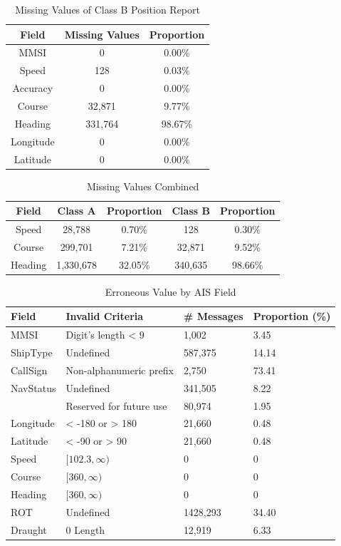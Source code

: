 \begin{table}[t!]
    \centering
    \caption{Missing Values of Class B Position Report}
    \label{tab:table3}
    \begin{tabular}{c|c|c}
      \hline
      \textbf{Field} & \textbf{Missing Values} & \textbf{Proportion}\\
      \hline
      MMSI & 0 & 0.00\%\\
      Speed & 128 & 0.03\%\\
      Accuracy & 0 & 0.00\%\\
      Course & 32,871 & 9.77\%\\
      Heading & 331,764 & 98.67\%\\
      Longitude & 0 & 0.00\%\\
      Latitude & 0 & 0.00\%\\
    \end{tabular}
\end{table}

\begin{table}[t!]
    \centering
    \caption{Missing Values Combined}
    \label{tab:table4}
    \begin{tabular}{c|c|c|c|c}
      \hline
      \textbf{Field} & \textbf{Class A} &\textbf{Proportion} & \textbf{Class B} & \textbf{Proportion}\\
      \hline
      Speed & 28,788 & 0.70\% & 128 & 0.30\%\\
      Course & 299,701 & 7.21\% & 32,871 & 9.52\%\\
      Heading & 1,330,678 & 32.05\% & 340,635 & 98.66\%\\
    \end{tabular}
\end{table}

\begin{table}[t!]
    \centering
    \caption{Erroneous Value by AIS Field}
    \label{tab:table5}
    \begin{tabular}{l|l|l|l}
      \hline
      \textbf{Field} & \textbf{Invalid Criteria} &\textbf{\# Messages} & \textbf{Proportion (\%)}\\
      \hline
      MMSI & Digit's length < 9 & 1,002 & 3.45\\
      ShipType & Undefined & 587,375 & 14.14\\
      CallSign & Non-alphanumeric prefix & 2,750 & 73.41\\
      NavStatus & Undefined & 341,505 & 8.22\\
                & Reserved for future use & 80,974 & 1.95\\
      Longitude & < -180 or > 180 & 21,660 & 0.48\\
      Latitude & < -90 or > 90 & 21,660 & 0.48\\
      Speed & $[102.3, \infty)$ & 0 & 0\\
      Course & $[360, \infty)$ & 0 & 0\\
      Heading & $[360, \infty)$ & 0 & 0\\
      ROT & Undefined & 1428,293 & 34.40\\
      Draught & 0 Length & 12,919 & 6.33\\
    \end{tabular}
\end{table}

